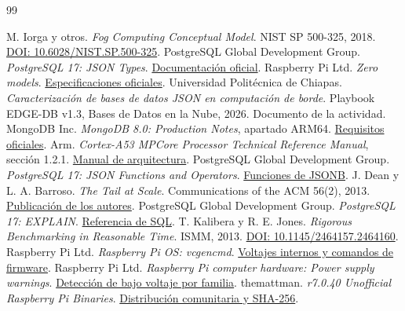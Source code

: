 \documentclass[10pt,a4paper]{article}
\begin{document}
\clearpage
{}
{}
\begin{thebibliography}{99}
\small\raggedright
{} M. Iorga y otros. \textit{Fog Computing Conceptual Model}. NIST SP 500-325, 2018. \href{https://doi.org/10.6028/NIST.SP.500-325}{DOI: 10.6028/NIST.SP.500-325}.
 PostgreSQL Global Development Group. \textit{PostgreSQL 17: JSON Types}. \href{https://www.postgresql.org/docs/17/datatype-json.html}{Documentación oficial}.
 Raspberry Pi Ltd. \textit{Zero models}. \href{https://www.raspberrypi.com/documentation/computers/zero.html}{Especificaciones oficiales}.
 Universidad Politécnica de Chiapas. \textit{Caracterización de bases de datos JSON en computación de borde}. Playbook EDGE-DB v1.3, Bases de Datos en la Nube, 2026. Documento de la actividad.
 MongoDB Inc. \textit{MongoDB 8.0: Production Notes}, apartado ARM64. \href{https://www.mongodb.com/docs/v8.0/administration/production-notes/#arm64}{Requisitos oficiales}.
 Arm. \textit{Cortex-A53 MPCore Processor Technical Reference Manual}, sección 1.2.1. \href{https://documentation-service.arm.com/static/6040c321ee937942ba301626}{Manual de arquitectura}.
 PostgreSQL Global Development Group. \textit{PostgreSQL 17: JSON Functions and Operators}. \href{https://www.postgresql.org/docs/17/functions-json.html}{Funciones de JSONB}.
 J. Dean y L. A. Barroso. \textit{The Tail at Scale}. Communications of the ACM 56(2), 2013. \href{https://research.google/pubs/the-tail-at-scale/}{Publicación de los autores}.
 PostgreSQL Global Development Group. \textit{PostgreSQL 17: EXPLAIN}. \href{https://www.postgresql.org/docs/17/sql-explain.html}{Referencia de SQL}.
 T. Kalibera y R. E. Jones. \textit{Rigorous Benchmarking in Reasonable Time}. ISMM, 2013. \href{https://doi.org/10.1145/2464157.2464160}{DOI: 10.1145/2464157.2464160}.
 Raspberry Pi Ltd. \textit{Raspberry Pi OS: vcgencmd}. \href{https://www.raspberrypi.com/documentation/computers/os.html#measure_volts-block}{Voltajes internos y comandos de firmware}.
 Raspberry Pi Ltd. \textit{Raspberry Pi computer hardware: Power supply warnings}. \href{https://www.raspberrypi.com/documentation/computers/raspberry-pi.html#power-supply-warnings}{Detección de bajo voltaje por familia}.
 themattman. \textit{r7.0.40 Unofficial Raspberry Pi Binaries}. \href{https://github.com/themattman/mongodb-raspberrypi-binaries/releases/tag/r7.0.40-rpi-unofficial}{Distribución comunitaria y SHA-256}.

\end{thebibliography}
\end{document}
